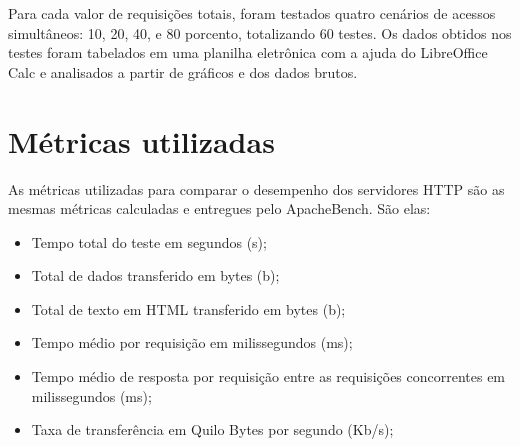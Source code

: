 Para cada valor de requisições totais, foram testados quatro cenários de 
acessos 
simultâneos: 10, 20, 40, e 80 porcento, totalizando 60 testes. Os dados obtidos 
nos testes foram tabelados em uma planilha eletrônica com a ajuda do 
LibreOffice Calc e analisados a partir de gráficos e dos dados brutos.

\section{Métricas utilizadas}

As métricas utilizadas para comparar o desempenho dos servidores HTTP são as 
mesmas métricas calculadas e entregues pelo ApacheBench. São elas:

\begin{itemize}
	\item Tempo total do teste em segundos (s);
	\item Total de dados transferido em bytes (b);
	\item Total de texto em HTML transferido em bytes (b);
	\item Tempo médio por requisição em milissegundos (ms);
	\item Tempo médio de resposta por requisição entre as requisições 
	concorrentes em milissegundos (ms);
	\item Taxa de transferência em Quilo Bytes por segundo (Kb/s);
\end{itemize}
